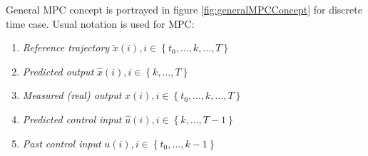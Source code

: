 \noindent General MPC concept is portrayed in figure \ref{fig:generalMPCConcept} for discrete time case. Usual notation is used for MPC:
\begin{enumerate}
    \item\textit{Reference trajectory} $\tilde{x}(i),i\in\left\{t_0,\dots,k,\dots,T\right\}$
    \item\textit{Predicted output} $\hat{x}(i),i\in\left\{k,\dots,T\right\}$
    \item\textit{Measured (real) output} $x(i),i\in\left\{t_0,\dots,k,\dots,T\right\}$
    \item\textit{Predicted control input} $\hat{u}(i),i\in\left\{k,\dots,T-1\right\}$
    \item\textit{Past control input} $u(i),i\in\left\{t_0,\dots,k-1\right\}$
\end{enumerate}

